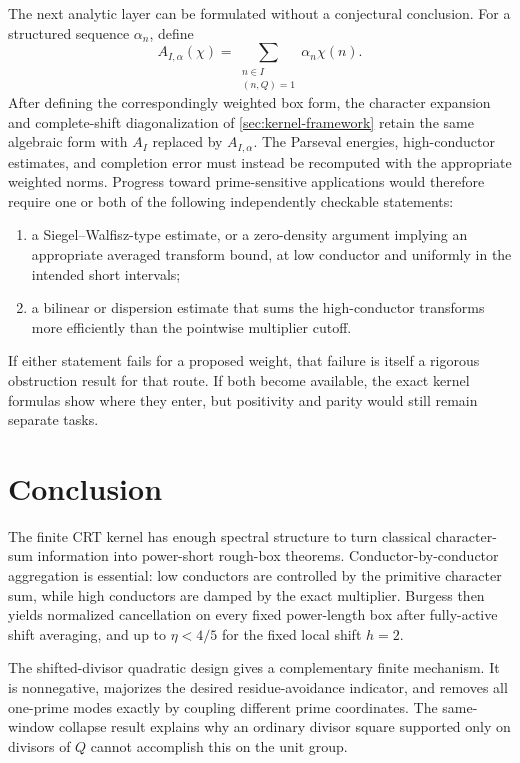 The next analytic layer can be formulated without a conjectural conclusion.  For a structured sequence $\alpha_n$, define
\[
 A_{I,\alpha}(\chi)
 =\sum_{\substack{n\in I\\(n,Q)=1}}\alpha_n\chi(n).
\]
After defining the correspondingly weighted box form, the character expansion and complete-shift diagonalization of \cref{sec:kernel-framework} retain the same algebraic form with $A_I$ replaced by $A_{I,\alpha}$.  The Parseval energies, high-conductor estimates, and completion error must instead be recomputed with the appropriate weighted norms.  Progress toward prime-sensitive applications would therefore require one or both of the following independently checkable statements:
\begin{enumerate}[label=(\alph*),leftmargin=2.4em]
 \item a Siegel--Walfisz-type estimate, or a zero-density argument implying an appropriate averaged transform bound, at low conductor and uniformly in the intended short intervals;
 \item a bilinear or dispersion estimate that sums the high-conductor transforms more efficiently than the pointwise multiplier cutoff.
\end{enumerate}
If either statement fails for a proposed weight, that failure is itself a rigorous obstruction result for that route.  If both become available, the exact kernel formulas show where they enter, but positivity and parity would still remain separate tasks.

\section{Conclusion}\label{sec:conclusion}

The finite CRT kernel has enough spectral structure to turn classical character-sum information into power-short rough-box theorems.  Conductor-by-conductor aggregation is essential: low conductors are controlled by the primitive character sum, while high conductors are damped by the exact multiplier.  Burgess then yields normalized cancellation on every fixed power-length box after fully-active shift averaging, and up to $\eta<4/5$ for the fixed local shift $h=2$.

The shifted-divisor quadratic design gives a complementary finite mechanism.  It is nonnegative, majorizes the desired residue-avoidance indicator, and removes all one-prime modes exactly by coupling different prime coordinates.  The same-window collapse result explains why an ordinary divisor square supported only on divisors of $Q$ cannot accomplish this on the unit group.

